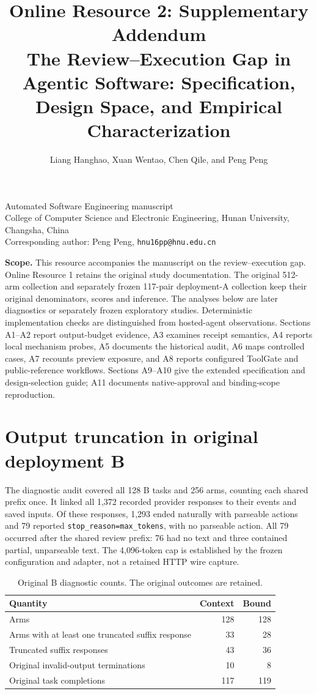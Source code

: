\documentclass[10pt,a4paper]{article}
\title{Online Resource 2: Supplementary Addendum\protect\\
\large The Review–Execution Gap in Agentic Software: Specification, Design Space, and Empirical Characterization}
\author{Liang Hanghao, Xuan Wentao, Chen Qile, and Peng Peng}
\date{}
\begin{document}
\maketitle
\begin{center}\small
Automated Software Engineering manuscript\\
College of Computer Science and Electronic Engineering, Hunan University, Changsha, China\\
Corresponding author: Peng Peng, \texttt{hnu16pp@hnu.edu.cn}
\end{center}
\noindent\textbf{Scope.} This resource accompanies the manuscript on the review--execution gap. Online Resource 1 retains the original study documentation. The original 512-arm collection and separately frozen 117-pair deployment-A collection keep their original denominators, scores and inference. The analyses below are later diagnostics or separately frozen exploratory studies. Deterministic implementation checks are distinguished from hosted-agent observations. Sections A1--A2 report output-budget evidence, A3 examines receipt semantics, A4 reports local mechanism probes, A5 documents the historical audit, A6 maps controlled cases, A7 recounts preview exposure, and A8 reports configured ToolGate and public-reference workflows. Sections A9--A10 give the extended specification and design-selection guide; A11 documents native-approval and binding-scope reproduction.

\section{Output truncation in original deployment B}
The diagnostic audit covered all 128 B tasks and 256 arms, counting each shared prefix once. It linked all 1,372 recorded provider responses to their events and saved inputs. Of these responses, 1,293 ended naturally with parseable actions and 79 reported \texttt{stop\_reason=max\_tokens}, with no parseable action. All 79 occurred after the shared review prefix: 76 had no text and three contained partial, unparseable text. The 4,096-token cap is established by the frozen configuration and adapter, not a retained HTTP wire capture.

\begin{table}[htbp]
\centering\small
\caption{Original B diagnostic counts. The original outcomes are retained.}
\begin{tabular}{lrr}
\toprule
Quantity & Context & Bound\\
\midrule
Arms & 128 & 128\\
Arms with at least one truncated suffix response & 33 & 28\\
Truncated suffix responses & 43 & 36\\
Original invalid-output terminations & 10 & 8\\
Original task completions & 117 & 119\\
\bottomrule
\end{tabular}
\end{table}
\end{document}
